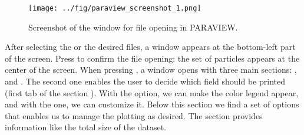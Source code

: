 \documentclass{../GPUSPHtemplate}
\begin{document}
\begin{figure}[h]
  \begin{center}
    \texttt{[image: ../fig/paraview\_screenshot\_1.png]}
    \caption{Screenshot of the window for file opening in PARAVIEW.}\label{fig:paraview_screenshot_1}   
  \end{center}
\end{figure}
After selecting the  or the desired  files, 
a window appears at the bottom-left part of the screen. 
Press  to confirm the file opening: the set of particles
appears at the center of the screen.
When pressing , a window opens with three main sections: 
,  and . 
The second one enables the user to decide which field should be printed 
(first tab of the section ). 
With the  option, we can make the color legend appear, 
and with the  one, we can customize it. 
Below this section we find a set of options that enables us to manage the plotting as desired.
The  section provides information like the total size of the dataset.\\
\end{document}

